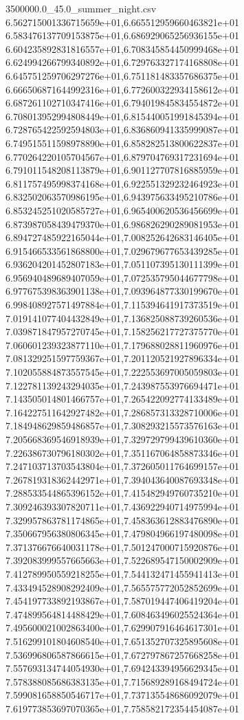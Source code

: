 \begin{filecontents*}{3500000.0_45.0_summer_night.csv}
6.562715001336715659e+01,6.665512959660463821e+01
6.583476137709153875e+01,6.686929065256936155e+01
6.604235892831816557e+01,6.708345854450999468e+01
6.624994266799340892e+01,6.729763327174168808e+01
6.645751259706297276e+01,6.751181483357686375e+01
6.666506871644992316e+01,6.772600322934158612e+01
6.687261102710347416e+01,6.794019845834554872e+01
6.708013952994808449e+01,6.815440051991845394e+01
6.728765422592594803e+01,6.836860941335999087e+01
6.749515511598978890e+01,6.858282513800622837e+01
6.770264220105704567e+01,6.879704769317231694e+01
6.791011548208113879e+01,6.901127707816885959e+01
6.811757495998374168e+01,6.922551329232464923e+01
6.832502063570986195e+01,6.943975633495210786e+01
6.853245251020585727e+01,6.965400620536456699e+01
6.873987058439479370e+01,6.986826290289081953e+01
6.894727485922165044e+01,7.008252642683146405e+01
6.915466533561868800e+01,7.029679677653439285e+01
6.936204201452807183e+01,7.051107395130111399e+01
6.956940489689407059e+01,7.072535795044677798e+01
6.977675398363901138e+01,7.093964877330199670e+01
6.998408927571497884e+01,7.115394641917373519e+01
7.019141077404432849e+01,7.136825088739260536e+01
7.039871847957270745e+01,7.158256217727375770e+01
7.060601239323877110e+01,7.179688028811960976e+01
7.081329251597759367e+01,7.201120521927896334e+01
7.102055884873557545e+01,7.222553697005059803e+01
7.122781139243294035e+01,7.243987553976694471e+01
7.143505014801466757e+01,7.265422092774133489e+01
7.164227511642927482e+01,7.286857313328710006e+01
7.184948629859486857e+01,7.308293215573576163e+01
7.205668369546918939e+01,7.329729799439610360e+01
7.226386730796180302e+01,7.351167064858873346e+01
7.247103713703543804e+01,7.372605011764699157e+01
7.267819318362442971e+01,7.394043640087693348e+01
7.288533544865396152e+01,7.415482949760735210e+01
7.309246393307820711e+01,7.436922940714975994e+01
7.329957863781174865e+01,7.458363612883476890e+01
7.350667956380806345e+01,7.479804966197480098e+01
7.371376676640031178e+01,7.501247000715920876e+01
7.392083999557665663e+01,7.522689547150002909e+01
7.412789950559218255e+01,7.544132471455941413e+01
7.433494528908292409e+01,7.565575772052852699e+01
7.454197733892193867e+01,7.587019447406419204e+01
7.474899564814488429e+01,7.608463496025524364e+01
7.495600021002863400e+01,7.629907916464617301e+01
7.516299101804608540e+01,7.651352707325895608e+01
7.536996806587866615e+01,7.672797867257668258e+01
7.557693134744054930e+01,7.694243394956629345e+01
7.578388085686383135e+01,7.715689289168494724e+01
7.599081658850546717e+01,7.737135548686092079e+01
7.619773853697070365e+01,7.758582172354454087e+01

\end{filecontents*}
